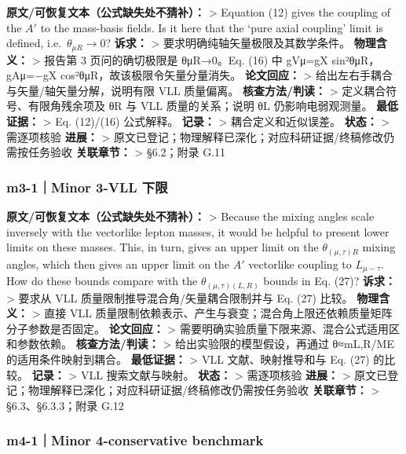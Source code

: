 \documentclass[
]{article}
\begin{document}
\textbf{原文/可恢复文本（公式缺失处不猜补）：} \textgreater{} Equation
(12) gives the coupling of the \(A'\) to the mass-basis fields. Is it
here that the `pure axial coupling' limit is defined,
i.e.~\(\theta_{\mu R}\to0\)? \textbf{诉求：} \textgreater{}
要求明确纯轴矢量极限及其数学条件。 \textbf{物理含义：} \textgreater{}
报告第 3 页问的确切极限是 θμR→0。Eq. (16) 中 gVμ=gX sin²θμR，gAμ=−gX
cos²θμR，故该极限令矢量分量消失。 \textbf{论文回应：} \textgreater{}
给出左右手耦合与矢量/轴矢量分解，说明有限 VLL 质量偏离。
\textbf{核查方法/判读：} \textgreater{} 定义耦合符号、有限角残余项及 θR
与 VLL 质量的关系；说明 θL 仍影响电弱观测量。 \textbf{最低证据：}
\textgreater{} Eq. (12)/(16) 公式解释。 \textbf{记录：} \textgreater{}
耦合定义和近似误差。 \textbf{状态：} \textgreater{} 需逐项核验
\textbf{进展：} \textgreater{}
原文已登记；物理解释已深化；对应科研证据/终稿修改仍需按任务验收
\textbf{关联章节：} \textgreater{} §6.2；附录 G.11

\subsubsection{m3-1｜Minor 3-VLL
下限}\label{m3-1minor-3-vll-ux4e0bux9650}

\textbf{原文/可恢复文本（公式缺失处不猜补）：} \textgreater{} Because
the mixing angles scale inversely with the vectorlike lepton masses, it
would be helpful to present lower limits on these masses. This, in turn,
gives an upper limit on the \(\theta_{(\mu,\tau)R}\) mixing angles,
which then gives an upper limit on the \(A'\) vectorlike coupling to
\(L_{\mu-\tau}\). How do these bounds compare with the
\(\theta_{(\mu,\tau)(L,R)}\) bounds in Eq. (27)? \textbf{诉求：}
\textgreater{} 要求从 VLL 质量限制推导混合角/矢量耦合限制并与 Eq. (27)
比较。 \textbf{物理含义：} \textgreater{} 直接 VLL
质量限制依赖表示、产生与衰变；混合角上限还依赖质量矩阵分子参数是否固定。
\textbf{论文回应：} \textgreater{}
需要明确实验质量下限来源、混合公式适用区和参数依赖。
\textbf{核查方法/判读：} \textgreater{} 给出实验限的模型假设，再通过
θ≈mL,R/ME 的适用条件映射到耦合。 \textbf{最低证据：} \textgreater{} VLL
文献、映射推导和与 Eq. (27) 的比较。 \textbf{记录：} \textgreater{} VLL
搜索文献与映射。 \textbf{状态：} \textgreater{} 需逐项核验
\textbf{进展：} \textgreater{}
原文已登记；物理解释已深化；对应科研证据/终稿修改仍需按任务验收
\textbf{关联章节：} \textgreater{} §6.3、§6.3.3；附录 G.12

\subsubsection{m4-1｜Minor 4-conservative
benchmark}\label{m4-1minor-4-conservative-benchmark}
\end{document}
